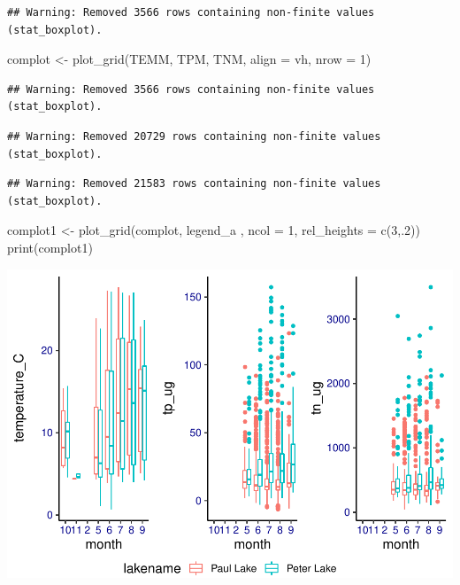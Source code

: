 \documentclass[]{article}
\newenvironment{Shaded}{\begin{snugshade}}{\end{snugshade}}
\newcommand{\AttributeTok}[1]{\textcolor[rgb]{0.77,0.63,0.00}{#1}}
\newcommand{\DecValTok}[1]{\textcolor[rgb]{0.00,0.00,0.81}{#1}}
\newcommand{\FunctionTok}[1]{\textcolor[rgb]{0.00,0.00,0.00}{#1}}
\newcommand{\NormalTok}[1]{#1}
\newcommand{\OtherTok}[1]{\textcolor[rgb]{0.56,0.35,0.01}{#1}}
\newcommand{\StringTok}[1]{\textcolor[rgb]{0.31,0.60,0.02}{#1}}
\begin{document}
\begin{verbatim}
## Warning: Removed 3566 rows containing non-finite values (stat_boxplot).
\end{verbatim}

\begin{Shaded}
\begin{Highlighting}[]
\NormalTok{complot }\OtherTok{\textless{}{-}} \FunctionTok{plot\_grid}\NormalTok{(TEMM, TPM, TNM, }\AttributeTok{align =} \StringTok{\textquotesingle{}vh\textquotesingle{}}\NormalTok{, }\AttributeTok{nrow =} \DecValTok{1}\NormalTok{)}
\end{Highlighting}
\end{Shaded}

\begin{verbatim}
## Warning: Removed 3566 rows containing non-finite values (stat_boxplot).
\end{verbatim}

\begin{verbatim}
## Warning: Removed 20729 rows containing non-finite values (stat_boxplot).
\end{verbatim}

\begin{verbatim}
## Warning: Removed 21583 rows containing non-finite values (stat_boxplot).
\end{verbatim}

\begin{Shaded}
\begin{Highlighting}[]
\NormalTok{complot1 }\OtherTok{\textless{}{-}} \FunctionTok{plot\_grid}\NormalTok{(complot, legend\_a , }\AttributeTok{ncol =} \DecValTok{1}\NormalTok{, }\AttributeTok{rel\_heights =} \FunctionTok{c}\NormalTok{(}\DecValTok{3}\NormalTok{,.}\DecValTok{2}\NormalTok{))}
\FunctionTok{print}\NormalTok{(complot1)}
\end{Highlighting}
\end{Shaded}

\includegraphics{A05_DataVisualization_files/figure-latex/unnamed-chunk-5-1.pdf}
\end{document}
